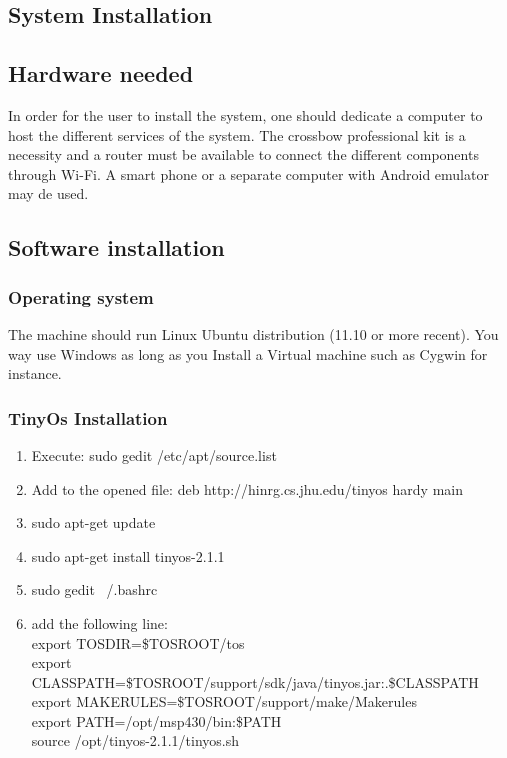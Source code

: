 \documentclass[oneside,12pt,a4paper,final]{book}
\begin{document}
\begin{appendices}
\chapter{System Installation}
\section{Hardware needed}
In order for the user to install the system, one should dedicate a computer to host the different services of the system. The crossbow professional kit is a necessity and a router must be available to connect the different components through Wi-Fi. A smart phone or a separate computer with Android emulator may de used.

\section{Software installation}

\subsection{Operating system}
The machine should run Linux Ubuntu distribution (11.10 or more recent). You way use Windows as long as you Install a Virtual machine such as Cygwin for instance.
\subsection{TinyOs Installation}
\begin{enumerate}
\item Execute: sudo gedit /etc/apt/source.list
\item Add to the opened file: deb http://hinrg.cs.jhu.edu/tinyos hardy main
\item sudo apt-get update 
\item sudo apt-get install tinyos-2.1.1
\item sudo gedit ~/.bashrc
\item add the following line: \\
export TOSDIR=\$TOSROOT/tos \\
export CLASSPATH=\$TOSROOT/support/sdk/java/tinyos.jar:.\$CLASSPATH \\
export MAKERULES=\$TOSROOT/support/make/Makerules \\
export PATH=/opt/msp430/bin:\$PATH \\
source /opt/tinyos-2.1.1/tinyos.sh \\


\end{enumerate}
\end{appendices}
\end{document}
